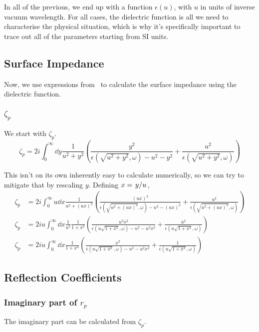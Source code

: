 \documentclass[../main.tex]{subfiles}
\begin{document}
	In all of the previous, we end up with a function $\epsilon(u)$, with $u$ in units of inverse vacuum wavelength.
	For all cases, the dielectric function is all we need to characterise the physical situation, which is why it's specifically important to trace out all of the parameters starting from SI units.

	\subsection{Surface Impedance} \label{subsec:nce:surfaceimpedance}
	Now, we use expressions from~\cite{Ford1984} to calculate the surface impedance using the dielectric function.

	\subsubsection{$\zeta_p$}
	We start with $\zeta_p$.
	\begin{equation}
		\zeta_p = 2i \int_0^\infty \dd{y} \frac{1}{u^2 + y^2} \left( \frac{y^2}{\epsilon(\sqrt{u^2 + y^2}, \omega) - u^2 - y^2} + \frac{u^2}{\epsilon(\sqrt{u^2 + y^2}, \omega)} \right)
	\end{equation}

	This isn't on its own inherently easy to calculate numerically, so we can try to mitigate that by rescaling $y$.
	Defining $x = \flatfrac{y}{u}$,
	\begin{align}
		\zeta_p &= 2i \int_0^\infty u \dd{x} \frac{1}{u^2 + (u x)^2} \left( \frac{(u x)^2}{\epsilon(\sqrt{u^2 + (u x)^2}, \omega) - u^2 - (u x)^2} + \frac{u^2}{\epsilon(\sqrt{u^2 + (u x)^2}, \omega)} \right) \\
		\zeta_p &= 2i u \int_0^\infty \dd{x} \frac{1}{u^2} \frac{1}{1 + x^2} \left( \frac{u^2 x^2}{\epsilon(u \sqrt{1 + x^2}, \omega) - u^2 - u^2 x^2} + \frac{u^2}{\epsilon(u \sqrt{1 + x^2}, \omega)} \right) \\
		\zeta_p &= 2i u \int_0^\infty \dd{x} \frac{1}{1 + x^2} \left( \frac{x^2}{\epsilon(u \sqrt{1 + x^2}, \omega) - u^2 - u^2 x^2} + \frac{1}{\epsilon(u \sqrt{1 + x^2}, \omega)} \right)
	\end{align}

	\subsection{Reflection Coefficients} \label{subsec:nce:reflectcoefs}
	\subsubsection{Imaginary part of $r_p$}
	The imaginary part can be calculated from $\zeta_p$.
\end{document}
